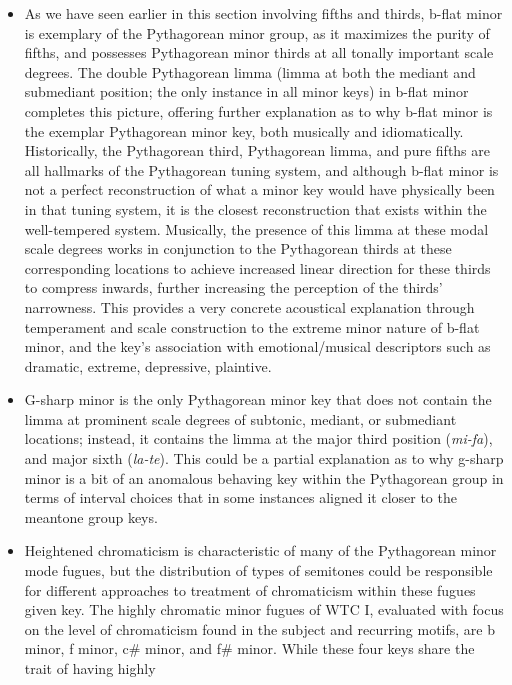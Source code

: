 \begin{itemize}
\tightlist
\item
  As we have seen earlier in this section involving fifths and thirds,
  b-flat minor is exemplary of the Pythagorean minor group, as it
  maximizes the purity of fifths, and possesses Pythagorean minor thirds
  at all tonally important scale degrees. The double Pythagorean limma
  (limma at both the mediant and submediant position; the only instance
  in all minor keys) in b-flat minor completes this picture, offering
  further explanation as to why b-flat minor is the exemplar Pythagorean
  minor key, both musically and idiomatically. Historically, the
  Pythagorean third, Pythagorean limma, and pure fifths are all
  hallmarks of the Pythagorean tuning system, and although b-flat minor
  is not a perfect reconstruction of what a minor key would have
  physically been in that tuning system, it is the closest
  reconstruction that exists within the well-tempered system. Musically,
  the presence of this limma at these modal scale degrees works in
  conjunction to the Pythagorean thirds at these corresponding locations
  to achieve increased linear direction for these thirds to compress
  inwards, further increasing the perception of the thirds' narrowness.
  This provides a very concrete acoustical explanation through
  temperament and scale construction to the extreme minor nature of
  b-flat minor, and the key's association with emotional/musical
  descriptors such as dramatic, extreme, depressive, plaintive.
\item
  G-sharp minor is the only Pythagorean minor key that does not contain
  the limma at prominent scale degrees of subtonic, mediant, or
  submediant locations; instead, it contains the limma at the major
  third position (\emph{mi-fa}), and major sixth (\emph{la-te}). This
  could be a partial explanation as to why g-sharp minor is a bit of an
  anomalous behaving key within the Pythagorean group in terms of
  interval choices that in some instances aligned it closer to the
  meantone group keys.
\item
  Heightened chromaticism is characteristic of many of the Pythagorean
  minor mode fugues, but the distribution of types of semitones could be
  responsible for different approaches to treatment of chromaticism
  within these fugues given key. The highly chromatic minor fugues of
  WTC I, evaluated with focus on the level of chromaticism found in the
  subject and recurring motifs, are b minor, f minor, c\# minor, and f\#
  minor. While these four keys share the trait of having highly

\end{itemize}
